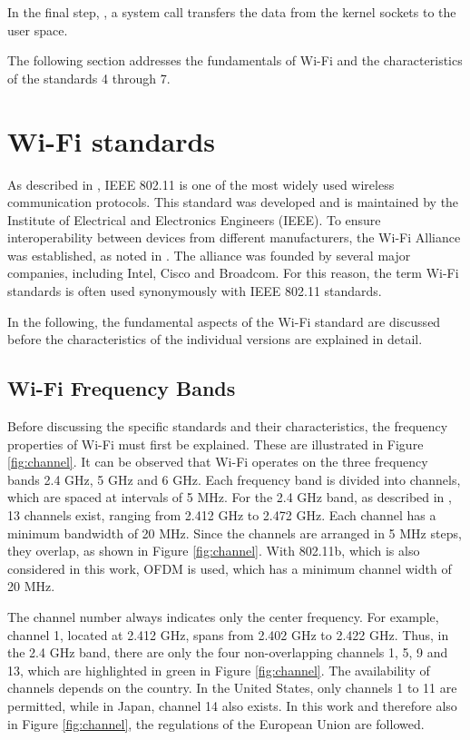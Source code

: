 In the final step, , a system call transfers the data from the kernel sockets to the user space.

The following section addresses the fundamentals of Wi-Fi and the characteristics of the standards 4 through 7.

\section{Wi-Fi standards} \label{subsec:stand}
As described in \cite[p. 56]{ofdm}, IEEE 802.11 is one of the most widely used wireless communication protocols.  
This standard was developed and is maintained by the Institute of Electrical and Electronics Engineers (IEEE).  
To ensure interoperability between devices from different manufacturers, the Wi-Fi Alliance was established, as noted in \cite{wifi_org}.  
The alliance was founded by several major companies, including Intel, Cisco and Broadcom.  
For this reason, the term Wi-Fi standards is often used synonymously with IEEE 802.11 standards.  

In the following, the fundamental aspects of the Wi-Fi standard are discussed before the characteristics of the individual versions are explained in detail.  

\subsection{Wi-Fi Frequency Bands}
Before discussing the specific standards and their characteristics, the frequency properties of Wi-Fi must first be explained.
These are illustrated in Figure \ref{fig:channel}.
It can be observed that Wi-Fi operates on the three frequency bands 2.4 GHz, 5 GHz and 6 GHz.
Each frequency band is divided into channels, which are spaced at intervals of 5 MHz.
For the 2.4 GHz band, as described in \cite[p. 2790]{9363693}, 13 channels exist, ranging from 2.412 GHz to 2.472 GHz.
Each channel has a minimum bandwidth of 20 MHz.
Since the channels are arranged in 5 MHz steps, they overlap, as shown in Figure \ref{fig:channel}.
With 802.11b, which is also considered in this work, \ac{OFDM} is used, which has a minimum channel width of 20 MHz.

The channel number always indicates only the center frequency.
For example, channel 1, located at 2.412 GHz, spans from 2.402 GHz to 2.422 GHz.
Thus, in the 2.4 GHz band, there are only the four non-overlapping channels 1, 5, 9 and 13, which are highlighted in green in Figure \ref{fig:channel}.
The availability of channels depends on the country.
In the United States, only channels 1 to 11 are permitted, while in Japan, channel 14 also exists.
In this work and therefore also in Figure \ref{fig:channel}, the regulations of the European Union are followed.

